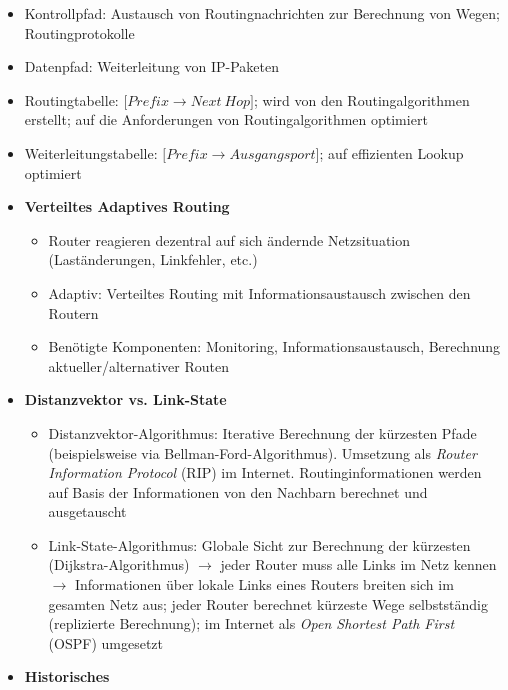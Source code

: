\begin{itemize}
	\item Kontrollpfad: Austausch von Routingnachrichten zur Berechnung von Wegen; Routingprotokolle
	\item Datenpfad: Weiterleitung von IP-Paketen
	\item Routingtabelle: \(\big\lbrack Prefix \rightarrow Next~Hop\big\rbrack \); wird von den Routingalgorithmen erstellt; auf die Anforderungen von Routingalgorithmen optimiert
	\item Weiterleitungstabelle: \(\big\lbrack Prefix \rightarrow Ausgangsport\big\rbrack\); auf effizienten Lookup optimiert
	\item \textbf{Verteiltes Adaptives Routing}
	\begin{itemize}
		\item Router reagieren dezentral auf sich ändernde Netzsituation (Laständerungen, Linkfehler, etc.)
		\item Adaptiv: Verteiltes Routing mit Informationsaustausch zwischen den Routern
		\item Benötigte Komponenten: Monitoring, Informationsaustausch, Berechnung aktueller/alternativer Routen
	\end{itemize}
	\item \textbf{Distanzvektor vs. Link-State}
	\begin{itemize}
		\item Distanzvektor-Algorithmus: Iterative Berechnung der kürzesten Pfade (beispielsweise via Bellman-Ford-Algorithmus). Umsetzung als \textit{Router Information Protocol} (RIP) im Internet. Routinginformationen werden auf Basis der Informationen von den Nachbarn berechnet und ausgetauscht
		\item Link-State-Algorithmus: Globale Sicht zur Berechnung der kürzesten (Dijkstra-Algorithmus) \(\rightarrow\) jeder Router muss alle Links im Netz kennen \(\rightarrow\) Informationen über lokale Links eines Routers breiten sich im gesamten Netz aus; jeder Router berechnet kürzeste Wege selbstständig (replizierte Berechnung); im Internet als \textit{Open Shortest Path First} (OSPF) umgesetzt
	\end{itemize}
	\item \textbf{Historisches}
\end{itemize}
